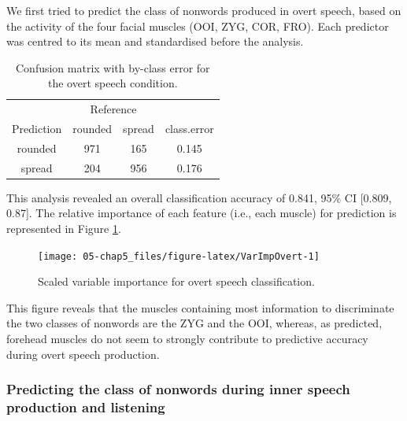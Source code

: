 \documentclass[a4paper,12pt,twoside,openright,oldfontcommands]{memoir}
\begin{document}
We first tried to predict the class of nonwords produced in overt speech, based on the activity of the four facial muscles (OOI, ZYG, COR, FRO). Each predictor was centred to its mean and standardised before the analysis.

\begin{table}[H]
\begin{center}
\begin{threeparttable}
\caption{\label{tab:CMovert}Confusion matrix with by-class error for the overt speech condition.}
\begin{tabular}{cccc}
\toprule
 & \multicolumn{2}{c}{Reference}  &\\
\cmidrule(r){2-3}
Prediction & \multicolumn{1}{c}{rounded} & \multicolumn{1}{c}{spread} & \multicolumn{1}{c}{class.error}\\
\midrule
rounded & 971 & 165 & 0.145\\
spread & 204 & 956 & 0.176\\
\bottomrule
\end{tabular}
\end{threeparttable}
\end{center}
\end{table}

This analysis revealed an overall classification accuracy of 0.841, 95\% CI {[}0.809, 0.87{]}. The relative importance of each feature (i.e., each muscle) for prediction is represented in Figure \ref{fig:VarImpOvert}.

\begin{figure}[H]

{\centering \texttt{[image: 05-chap5\_files/figure-latex/VarImpOvert-1]} 

}

\caption{Scaled variable importance for overt speech classification.}\label{fig:VarImpOvert}
\end{figure}

This figure reveals that the muscles containing most information to discriminate the two classes of nonwords are the ZYG and the OOI, whereas, as predicted, forehead muscles do not seem to strongly contribute to predictive accuracy during overt speech production.

\hypertarget{predicting-the-class-of-nonwords-during-inner-speech-production-and-listening}{%
\subsubsection{Predicting the class of nonwords during inner speech production and listening}\label{predicting-the-class-of-nonwords-during-inner-speech-production-and-listening}}
\end{document}
